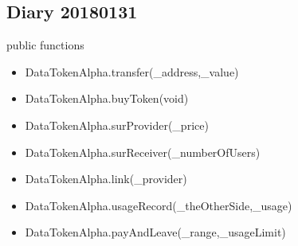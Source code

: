 \subsection{Diary 20180131}
public functions 
\begin{itemize}
    \item DataTokenAlpha.transfer(\_address,\_value)\\
    \item DataTokenAlpha.buyToken(void)\\
    \item DataTokenAlpha.surProvider(\_price)\\
    \item DataTokenAlpha.surReceiver(\_numberOfUsers)\\
    \item DataTokenAlpha.link(\_provider)\\
    \item DataTokenAlpha.usageRecord(\_theOtherSide,\_usage)\\
    \item DataTokenAlpha.payAndLeave(\_range,\_usageLimit)\\
\end{itemize}

%


